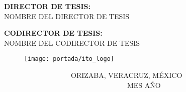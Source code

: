 \begin{titlepage}
    \vspace{1\baselineskip}
    \begin{center}
        \fontsize{11}{12}\selectfont \textbf{DIRECTOR DE TESIS:} \\
        \fontsize{12}{12}\selectfont NOMBRE DEL DIRECTOR DE TESIS
    \end{center}
    
    \vspace{1\baselineskip}
    \begin{center}
        \fontsize{11}{12}\selectfont \textbf{CODIRECTOR DE TESIS:} \\
        \fontsize{12}{12}\selectfont NOMBRE DEL CODIRECTOR DE TESIS
    \end{center}
    
    \begin{figure}[H]
        \texttt{[image: portada/ito\_logo]}
    \end{figure}
    
    \vspace{1\baselineskip}
    \begin{flushleft}
        \fontsize{11}{12}\selectfont \ \ \ \ \ \ \ \ \ \ \ \ \ \ \ \ \ \ \ ORIZABA, VERACRUZ, MÉXICO \ \ \ \ \ \ \ \ \ \ \ \ \ \ \ \ \ \ \ \ \ \ \ \ \ \ \ \ \ \ \ \ \ \ \ MES AÑO
    \end{flushleft}
\end{titlepage}
